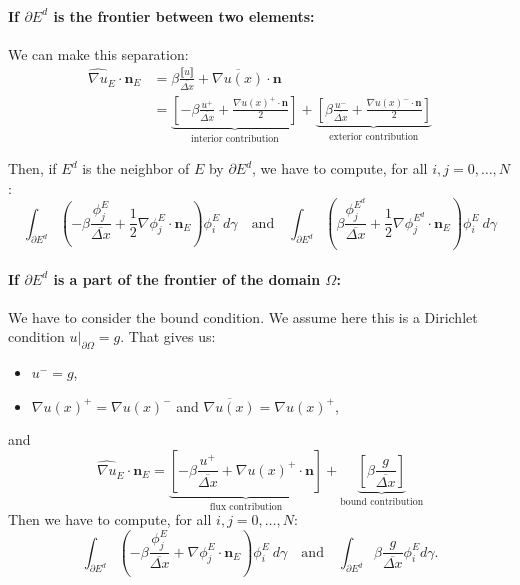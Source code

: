 \documentclass[a4paper,10pt,draft]{article}
\begin{document}
\paragraph{If $\partial E^d$ is the frontier between two elements:}

We can make this separation:
\begin{align*}
 \widehat{\nabla u}_E \cdot \mathbf{n}_E 
 &= \beta \frac{\llbracket u \rrbracket}{\overline{\Delta x}} + \overline{\nabla u(x)} \cdot 
\mathbf{n} \\
&= \underbrace{ \left[-\beta \frac{u^+}{\overline{\Delta x}} + \frac{ \nabla u(x)^+ \cdot 
\mathbf{n}}{2} \right]}_{ \text{interior contribution} } 
+ \underbrace{\left[ \beta \frac{u^-}{\overline{\Delta x}} + \frac{ \nabla u(x)^- \cdot 
\mathbf{n}}{2} \right]}_{ \text{exterior contribution} }
\end{align*}

Then, if $E^d$ is the neighbor of $E$ by $\partial E^d$, we have to compute, for all $i,j 
=0,\dots,N$:
\begin{equation*}
 \int_{\partial E^d} \left( - \beta \frac{\phi_j^E}{\overline{\Delta x}}  + \frac{1}{2} \nabla 
\phi_j^E \cdot \mathbf{n}_E \right) \phi_i^E \ d \gamma
\quad \text{and} \quad
\int_{\partial E^d} \left( \beta \frac{\phi_j^{E^d}}{\overline{\Delta x}}  + \frac{1}{2} \nabla 
\phi_j^{E^d} \cdot \mathbf{n}_E \right) \phi_i^E \ d \gamma
\end{equation*}

\paragraph{If $\partial E^d$ is a part of the frontier of the domain $\Omega$:}
We have to consider the bound condition. We assume here this is a Dirichlet condition 
$u|_{\partial \Omega} = g$. That gives us:
\begin{itemize}
 \item $u^- = g$,
 \item $\nabla u(x)^+ = \nabla u(x)^-$ and $\overline{\nabla u(x)} = \nabla u(x)^+$,
\end{itemize}
and
\begin{equation*}
 \widehat{\nabla u}_E \cdot \mathbf{n}_E 
 = \underbrace{\left[ -\beta \frac{u^+}{\overline{\Delta x}} + \nabla u(x)^+ \cdot 
\mathbf{n} \right]}_{\text{flux contribution}}
+ \underbrace{\left[ \beta \frac{g}{\overline{\Delta x}} \right]}_{\text{bound contribution}}
\end{equation*}
Then we have to compute, for all $i,j=0,\dots,N$:
\begin{equation*}
\int_{\partial E^d} \left( - \beta \frac{\phi_j^E}{\overline{\Delta x}}  + \nabla 
\phi_j^E \cdot \mathbf{n}_E \right) \phi_i^E \ d \gamma
\quad \text{and} \quad
\int_{\partial E^d} \beta \frac{g}{\overline{\Delta x}} \phi_i^E d\gamma.
\end{equation*}
\end{document}
